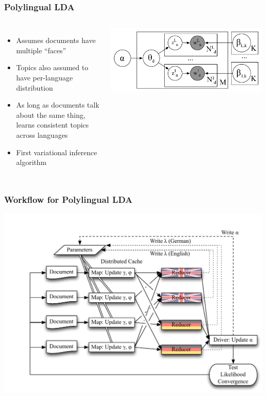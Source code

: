 \begin{frame}
	\frametitle{Polylingual LDA}
	
	\begin{columns}
			\begin{itemize}
				\item Assumes documents have multiple ``faces''~\cite{mimno-09}
				\item Topics also assumed to have per-language distribution
				\item As long as documents talk about the same thing, learns consistent topics across languages
				\item First variational inference algorithm
			\end{itemize}

			\includegraphics[width=0.9\linewidth]{mrlda/polylda}
	
	\end{columns}
	
\end{frame}


\begin{frame}
	\frametitle{Workflow for Polylingual LDA}
	
	\centering
	\includegraphics[width=0.8\linewidth]{mrlda/workflow_multilingual}
	
\end{frame}

